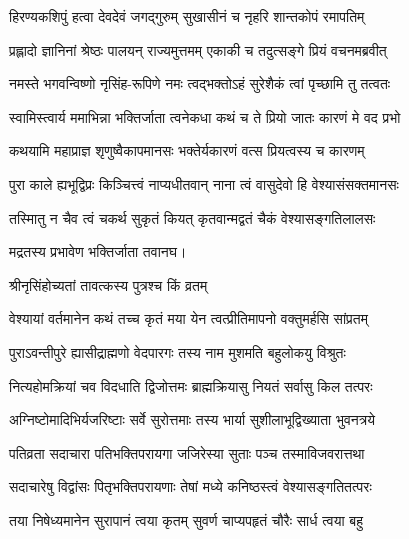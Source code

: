 

\twolineshloka
{हिरण्यकशिपुं हत्वा देवदेवं जगद्गुरुम्}
{सुखासीनं च नृहरि शान्तकोपं रमापतिम्} %

\twolineshloka
{प्रह्लादो ज्ञानिनां श्रेष्ठः पालयन् राज्यमुत्तमम्}
{एकाकी च तदुत्सङ्गे प्रियं वचनमब्रवीत्} %


\twolineshloka
{नमस्ते भगवन्विष्णो नृसिंह-रूपिणे नमः}
{त्वद्भक्तोऽहं सुरेशैकं त्वां पृच्छामि तु तत्वतः} %

\twolineshloka
{स्वामिस्त्वार्य ममाभिन्ना भक्तिर्जाता त्वनेकधा}
{कथं च ते प्रियो जातः कारणं मे वद प्रभो} %


\twolineshloka
{कथयामि महाप्राज्ञ शृणुष्वैकापमानसः}
{भक्तेर्यकारणं वत्स प्रियत्वस्य च कारणम्} %

\twolineshloka
{पुरा काले ह्यभूद्विप्रः किञ्चित्त्वं नाप्यधीतवान्}
{नाना त्वं वासुदेवो हि वेश्यासंसक्तमानसः} %


\twolineshloka
{तस्मिातु न चैव त्वं चकर्थ सुकृतं कियत्}
{कृतवान्मद्वतं चैकं वेश्यासङ्गतिलालसः} %


{मद्रतस्य प्रभावेण भक्तिर्जाता तवानघ।}


\onelineshloka
{श्रीनृसिंहोच्यतां तावत्कस्य पुत्रश्च किं व्रतम्} %

\twolineshloka
{वेश्यायां वर्तमानेन कथं तच्च कृतं मया}
{येन त्वत्प्रीतिमापनो वक्तुमर्हसि सांप्रतम्} %


\twolineshloka
{पुराऽवन्तीपुरे ह्यासीद्राह्मणो वेदपारगः}
{तस्य नाम मुशमति बहुलोकयु विश्रुतः} %

\twolineshloka
{नित्यहोमक्रियां चव विदधाति द्विजोत्तमः}
{ब्राह्मक्रियासु नियतं सर्वासु किल तत्परः} %

\twolineshloka
{अग्निष्टोमादिभिर्यजरिष्टाः सर्वे सुरोत्तमाः}
{तस्य भार्या सुशीलाभूद्विख्याता भुवनत्रये} %

\twolineshloka
{पतिव्रता सदाचारा पतिभक्तिपरायगा}
{जजिरेस्या सुताः पञ्च तस्माविजवरात्तथा} %

\twolineshloka
{सदाचारेषु विद्वांसः पितृभक्तिपरायणाः}
{तेषां मध्ये कनिष्ठस्त्वं वेश्यासङ्गतितत्परः} %

\twolineshloka
{तया निषेध्यमानेन सुरापानं त्वया कृतम्}
{सुवर्ण चाप्यपहृतं चौरैः सार्ध त्वया बहु} %

